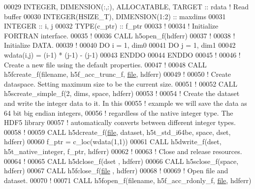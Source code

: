 \begin{DoxyCode}
00029   \textcolor{keywordtype}{INTEGER}, \textcolor{keywordtype}{DIMENSION(:,:)}, \textcolor{keywordtype}{ALLOCATABLE}, \textcolor{keywordtype}{TARGET} :: rdata \textcolor{comment}{! Read buffer}
00030   \textcolor{keywordtype}{INTEGER(HSIZE\_T)}, \textcolor{keywordtype}{DIMENSION(1:2)} :: maxdims
00031   \textcolor{keywordtype}{INTEGER} :: i, j
00032   \textcolor{keywordtype}{TYPE}(c\_ptr) :: f\_ptr
00033   \textcolor{comment}{!}
00034   \textcolor{comment}{! Initialize FORTRAN interface.}
00035   \textcolor{comment}{!}
00036   \textcolor{keyword}{CALL }h5open\_f(hdferr)
00037   \textcolor{comment}{!}
00038   \textcolor{comment}{! Initialize DATA.}
00039   \textcolor{comment}{!}
00040   \textcolor{keywordflow}{DO} i = 1, dim0
00041      \textcolor{keywordflow}{DO} j = 1, dim1
00042         wdata(i,j) = (i-1) * (j-1) - (j-1)
00043 \textcolor{keywordflow}{     ENDDO}
00044 \textcolor{keywordflow}{  ENDDO}
00045   \textcolor{comment}{!}
00046   \textcolor{comment}{! Create a new file using the default properties.}
00047   \textcolor{comment}{!}
00048   \textcolor{keyword}{CALL }h5fcreate\_f(filename, h5f\_acc\_trunc\_f, \hyperlink{structfile}{file}, hdferr)
00049   \textcolor{comment}{!}
00050   \textcolor{comment}{! Create dataspace.  Setting maximum size to be the current size.}
00051   \textcolor{comment}{!}
00052   \textcolor{keyword}{CALL }h5screate\_simple\_f(2, dims, space, hdferr)
00053   \textcolor{comment}{!}
00054   \textcolor{comment}{! Create the dataset and write the integer data to it.  In this}
00055   \textcolor{comment}{! example we will save the data as 64 bit big endian integers,}
00056   \textcolor{comment}{! regardless of the native integer type.  The HDF5 library}
00057   \textcolor{comment}{! automatically converts between different integer types.}
00058   \textcolor{comment}{!}
00059   \textcolor{keyword}{CALL }h5dcreate\_f(\hyperlink{structfile}{file}, dataset, h5t\_std\_i64be, space, dset, hdferr)
00060   f\_ptr = c\_loc(wdata(1,1))
00061   \textcolor{keyword}{CALL }h5dwrite\_f(dset, h5t\_native\_integer, f\_ptr, hdferr)
00062   \textcolor{comment}{!}
00063   \textcolor{comment}{! Close and release resources.}
00064   \textcolor{comment}{!}
00065   \textcolor{keyword}{CALL }h5dclose\_f(dset , hdferr)
00066   \textcolor{keyword}{CALL }h5sclose\_f(space, hdferr)
00067   \textcolor{keyword}{CALL }h5fclose\_f(\hyperlink{structfile}{file} , hdferr)
00068   \textcolor{comment}{!}
00069   \textcolor{comment}{! Open file and dataset.}
00070   \textcolor{comment}{!}
00071   \textcolor{keyword}{CALL }h5fopen\_f(filename, h5f\_acc\_rdonly\_f, \hyperlink{structfile}{file}, hdferr)

\end{DoxyCode}

